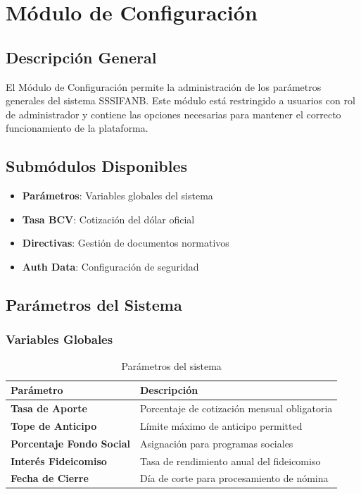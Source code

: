 
\chapter{Módulo de Configuración}
\label{ch:configuracion}

\section{Descripción General}

El Módulo de Configuración permite la administración de los parámetros generales del sistema SSSIFANB. Este módulo está restringido a usuarios con rol de administrador y contiene las opciones necesarias para mantener el correcto funcionamiento de la plataforma.

\section{Submódulos Disponibles}

\begin{itemize}[leftmargin=*]
    \item \textbf{Parámetros}: Variables globales del sistema
    \item \textbf{Tasa BCV}: Cotización del dólar oficial
    \item \textbf{Directivas}: Gestión de documentos normativos
    \item \textbf{Auth Data}: Configuración de seguridad
\end{itemize}

\section{Parámetros del Sistema}

\subsection*{Variables Globales}

\begin{longtable}{p{4cm}p{8cm}}
\toprule
\textbf{Parámetro} & \textbf{Descripción} \\
\midrule
\endhead
\bottomrule
\caption{Parámetros del sistema}
\label{tab:parametros}
\endlastfoot

\textbf{Tasa de Aporte} & Porcentaje de cotización mensual obligatoria \\
\textbf{Tope de Anticipo} & Límite máximo de anticipo permitted \\
\textbf{Porcentaje Fondo Social} & Asignación para programas sociales \\
\textbf{Interés Fideicomiso} & Tasa de rendimiento anual del fideicomiso \\
\textbf{Fecha de Cierre} & Día de corte para procesamiento de nómina \\
\end{longtable}

